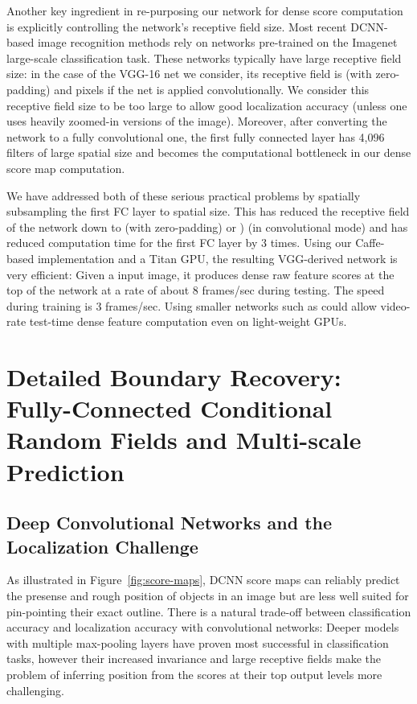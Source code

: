 Another key ingredient in re-purposing our network for dense score computation
is explicitly controlling the network's receptive field size. Most recent
DCNN-based image recognition methods rely on networks pre-trained on the
Imagenet large-scale classification task. These networks typically have large
receptive field size: in the case of the VGG-16 net we consider, its receptive
field is  (with zero-padding) and  pixels if the net
is applied convolutionally. We consider this receptive field size to be too
large to allow good localization accuracy (unless one uses heavily zoomed-in
versions of the image). Moreover, after converting the network to a fully
convolutional one, the first fully connected layer has 4,096 filters of large
 spatial size and becomes the computational bottleneck in our dense
score map computation.

We have addressed both of these serious practical problems by spatially
subsampling the first FC layer to  spatial size. This has reduced the
receptive field of the network down to  (with zero-padding) or
) (in convolutional mode) and has reduced computation time for
the first FC layer by 3 times. Using our Caffe-based implementation and a
Titan GPU, the resulting VGG-derived network is very efficient: Given a
 input image, it produces  dense raw feature scores at
the top of the network at a rate of about 8 frames/sec during testing. The
speed during training is 3 frames/sec. Using smaller networks such as
\citet{KrizhevskyNIPS2013} could allow video-rate test-time dense feature
computation even on light-weight GPUs.

\section{Detailed Boundary Recovery: Fully-Connected Conditional Random Fields and Multi-scale Prediction}
\label{sec:boundary-recovery}

\subsection{Deep Convolutional Networks and the Localization Challenge}
\label{sec:local-chal}

As illustrated in Figure~\ref{fig:score-maps}, DCNN score maps can
reliably predict the presense and rough position of objects in an image but
are less well suited for pin-pointing their exact outline. There is a natural
trade-off between classification accuracy and localization accuracy with
convolutional networks: Deeper models with multiple max-pooling layers have
proven most successful in classification tasks, however their increased
invariance and large receptive fields make the problem of inferring position
from the scores at their top output levels more challenging.

